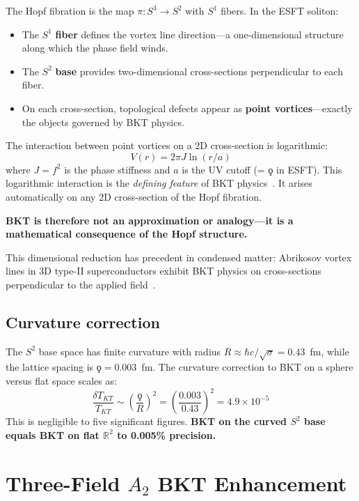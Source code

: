 ﻿\documentclass[twocolumn,showpacs,preprintnumbers,amsmath,amssymb,prd]{revtex4-2}
\begin{document}
The Hopf fibration is the map $\pi: S^3 \to S^2$ with $S^1$ fibers. In the ESFT soliton:
\begin{itemize}
\item The $S^1$ \textbf{fiber} defines the vortex line direction---a one-dimensional structure along which the phase field winds.
\item The $S^2$ \textbf{base} provides two-dimensional cross-sections perpendicular to each fiber.
\item On each cross-section, topological defects appear as \textbf{point vortices}---exactly the objects governed by BKT physics.
\end{itemize}

The interaction between point vortices on a 2D cross-section is logarithmic:
\begin{equation}
V(r) = 2\pi J \ln(r/a)
\end{equation}
where $J = f^2$ is the phase stiffness and $a$ is the UV cutoff (= $\koppa$ in ESFT). This logarithmic interaction is the \emph{defining feature} of BKT physics~\cite{Kosterlitz1973}. It arises automatically on any 2D cross-section of the Hopf fibration.

\textbf{BKT is therefore not an approximation or analogy---it is a mathematical consequence of the Hopf structure.}

This dimensional reduction has precedent in condensed matter: Abrikosov vortex lines in 3D type-II superconductors exhibit BKT physics on cross-sections perpendicular to the applied field~\cite{Fisher1991,Beasley1979,Halperin1978}.

\subsection{Curvature correction}

The $S^2$ base space has finite curvature with radius $R \approx \hbar c/\sqrt{\sigma} = 0.43$~fm, while the lattice spacing is $\koppa = 0.003$~fm. The curvature correction to BKT on a sphere versus flat space scales as:
\begin{equation}
\frac{\delta T_{KT}}{T_{KT}} \sim \left(\frac{\koppa}{R}\right)^2 = \left(\frac{0.003}{0.43}\right)^2 = 4.9 \times 10^{-5}
\end{equation}
This is negligible to five significant figures. \textbf{BKT on the curved $S^2$ base equals BKT on flat $\mathbb{R}^2$ to 0.005\% precision.}

\section{Three-Field $A_2$ BKT Enhancement}
\label{sec:a2}
\end{document}

